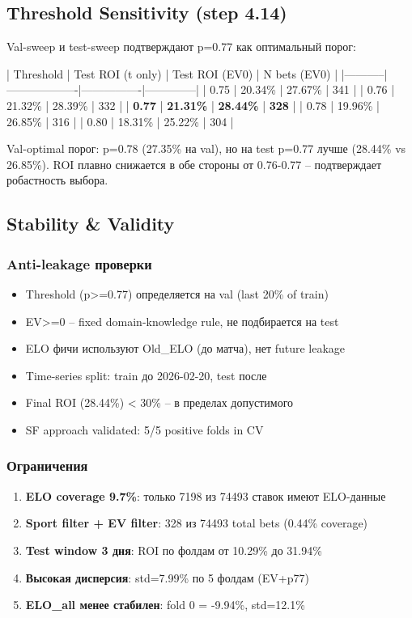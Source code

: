 \documentclass[12pt,a4paper]{article}
\begin{document}
\subsection{Threshold Sensitivity (step 4.14)}
Val-sweep и test-sweep подтверждают p=0.77 как оптимальный порог:

| Threshold | Test ROI (t only) | Test ROI (EV0) | N bets (EV0) |
|-----------|-------------------|----------------|--------------|
| 0.75 | 20.34\% | 27.67\% | 341 |
| 0.76 | 21.32\% | 28.39\% | 332 |
| \textbf{0.77} | \textbf{21.31\%} | \textbf{28.44\%} | \textbf{328} |
| 0.78 | 19.96\% | 26.85\% | 316 |
| 0.80 | 18.31\% | 25.22\% | 304 |

Val-optimal порог: p=0.78 (27.35\% на val), но на test p=0.77 лучше (28.44\% vs 26.85\%).
ROI плавно снижается в обе стороны от 0.76-0.77 -- подтверждает робастность выбора.

\subsection{Stability \& Validity}
\subsubsection{Anti-leakage проверки}
\begin{itemize}
  \item Threshold (p>=0.77) определяется на val (last 20\% of train)
  \item EV>=0 -- fixed domain-knowledge rule, не подбирается на test
  \item ELO фичи используют Old\_ELO (до матча), нет future leakage
  \item Time-series split: train до 2026-02-20, test после
  \item Final ROI (28.44\%) < 30\% -- в пределах допустимого
  \item SF approach validated: 5/5 positive folds in CV
\end{itemize}

\subsubsection{Ограничения}
\begin{enumerate}
  \item \textbf{ELO coverage 9.7\%}: только 7198 из 74493 ставок имеют ELO-данные
  \item \textbf{Sport filter + EV filter}: 328 из 74493 total bets (0.44\% coverage)
  \item \textbf{Test window 3 дня}: ROI по фолдам от 10.29\% до 31.94\%
  \item \textbf{Высокая дисперсия}: std=7.99\% по 5 фолдам (EV+p77)
  \item \textbf{ELO\_all менее стабилен}: fold 0 = -9.94\%, std=12.1\%
\end{enumerate}
\end{document}
